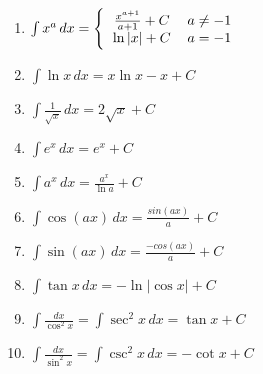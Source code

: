 \begin{center}
	\begin{small}
		\begin{enumerate}
			\item \begin{math}
				      \int x^a\,dx =
				      \Bigg\{\begin{tabular}{ccc}
					      $\frac{x^{a+1}}{a+1} + C$  & $a \neq -1$ & \\
					      $ \ln{\left|x\right|} + C$ & $a = -1$    & \\
				      \end{tabular}
			      \end{math}
			\item \begin{math}
				      \int \ln {x}\,dx = x \ln {x} - x + C
			      \end{math}
			\item \begin{math}
				      \int \frac {1}{\sqrt{x}}\,dx=2\sqrt{x} + C
			      \end{math}
			\item \begin{math}
				      \int e^x\,dx = e^x + C
			      \end{math}
			\item \begin{math}
				      \int a^x\,dx = \frac{a^x}{\ln{a}} + C
			      \end{math}
			\item \begin{math}
				      \int \cos({ax}) \, dx = { \frac{sin (ax)}{a} } + C
			      \end{math}
			\item \begin{math}
				      \int \sin({ax}) \, dx = { \frac{-cos(ax)}{a} } + C
			      \end{math}
			\item \begin{math}
				      \int \tan{x} \, dx = -\ln{\left| \cos {x} \right|} + C
			      \end{math}
			\item \begin{math}
				      \int \frac{dx}{\cos^2 x}=\int \sec^2 x \, dx = \tan x + C
			      \end{math}
			\item \begin{math}
				      \int \frac{dx}{\sin^2 x}=\int \csc^2 x \, dx = -\cot x + C
			      \end{math}

\end{enumerate}
\end{small}
\end{center}
